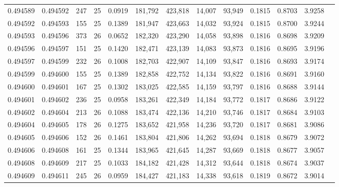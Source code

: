 \begin{tabular}{rrrrrrrrrrrrr}
0.494589 & 0.494592 & 247 &  25 &                                     0.0919 & 181,792 & 423,818 &  14,007 &  93,949 & 0.1815 & 0.8703 & 3.9258 \\
0.494592 & 0.494593 & 155 &  25 &                                     0.1389 & 181,947 & 423,663 &  14,032 &  93,924 & 0.1815 & 0.8700 & 3.9244 \\
0.494593 & 0.494596 & 373 &  26 &                                     0.0652 & 182,320 & 423,290 &  14,058 &  93,898 & 0.1816 & 0.8698 & 3.9209 \\
0.494596 & 0.494597 & 151 &  25 &                                     0.1420 & 182,471 & 423,139 &  14,083 &  93,873 & 0.1816 & 0.8695 & 3.9196 \\
0.494597 & 0.494599 & 232 &  26 &                                     0.1008 & 182,703 & 422,907 &  14,109 &  93,847 & 0.1816 & 0.8693 & 3.9174 \\
0.494599 & 0.494600 & 155 &  25 &                                     0.1389 & 182,858 & 422,752 &  14,134 &  93,822 & 0.1816 & 0.8691 & 3.9160 \\
0.494600 & 0.494601 & 167 &  25 &                                     0.1302 & 183,025 & 422,585 &  14,159 &  93,797 & 0.1816 & 0.8688 & 3.9144 \\
0.494601 & 0.494602 & 236 &  25 &                                     0.0958 & 183,261 & 422,349 &  14,184 &  93,772 & 0.1817 & 0.8686 & 3.9122 \\
0.494602 & 0.494604 & 213 &  26 &                                     0.1088 & 183,474 & 422,136 &  14,210 &  93,746 & 0.1817 & 0.8684 & 3.9103 \\
0.494604 & 0.494605 & 178 &  26 &                                     0.1275 & 183,652 & 421,958 &  14,236 &  93,720 & 0.1817 & 0.8681 & 3.9086 \\
0.494605 & 0.494606 & 152 &  26 &                                     0.1461 & 183,804 & 421,806 &  14,262 &  93,694 & 0.1818 & 0.8679 & 3.9072 \\
0.494606 & 0.494608 & 161 &  25 &                                     0.1344 & 183,965 & 421,645 &  14,287 &  93,669 & 0.1818 & 0.8677 & 3.9057 \\
0.494608 & 0.494609 & 217 &  25 &                                     0.1033 & 184,182 & 421,428 &  14,312 &  93,644 & 0.1818 & 0.8674 & 3.9037 \\
0.494609 & 0.494611 & 245 &  26 &                                     0.0959 & 184,427 & 421,183 &  14,338 &  93,618 & 0.1819 & 0.8672 & 3.9014 \\

\end{tabular}
